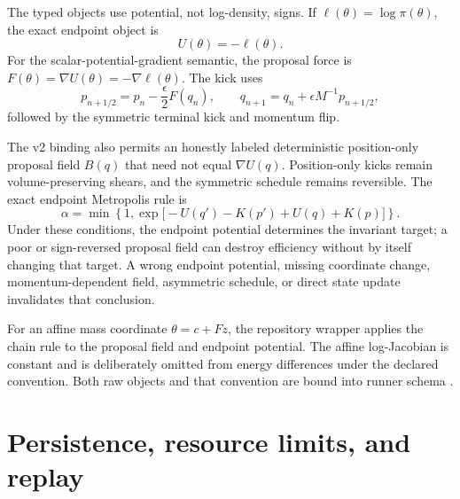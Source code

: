 The typed objects use potential, not log-density, signs.  If
\(\ell(\theta)=\log \pi(\theta)\), the exact endpoint object is
\begin{equation}
  U(\theta)=-\ell(\theta).
  \label{eq:bf-neural-force-endpoint-potential}
\end{equation}
For the scalar-potential-gradient semantic, the proposal force is
\(F(\theta)=\nabla U(\theta)=-\nabla\ell(\theta)\).  The kick uses
\begin{equation}
  p_{n+1/2}=p_n-\frac{\epsilon}{2}F(q_n),
  \qquad
  q_{n+1}=q_n+\epsilon M^{-1}p_{n+1/2},
  \label{eq:bf-neural-force-kick}
\end{equation}
followed by the symmetric terminal kick and momentum flip.

The v2 binding also permits an honestly labeled deterministic position-only
proposal field \(B(q)\) that need not equal \(\nabla U(q)\).  Position-only
kicks remain volume-preserving shears, and the symmetric schedule remains
reversible.  The exact endpoint Metropolis rule is
\begin{equation}
  \alpha
  = \min\left\{1,
      \exp\bigl[-U(q')-K(p')+U(q)+K(p)\bigr]\right\}.
  \label{eq:bf-neural-force-endpoint-correction}
\end{equation}
Under these conditions, the endpoint potential determines the invariant target;
a poor or sign-reversed proposal field can destroy efficiency without by itself
changing that target.  A wrong endpoint potential, missing coordinate change,
momentum-dependent field, asymmetric schedule, or direct state update invalidates
that conclusion.

For an affine mass coordinate \(\theta=c+Fz\), the repository wrapper applies
the chain rule to the proposal field and endpoint potential.  The affine
log-Jacobian is constant and is deliberately omitted from energy differences
under the declared  convention.  Both raw objects and
that convention are bound into runner schema
.




\section{Persistence, resource limits, and replay}
\label{sec:bf-hmc-replay-roles}

